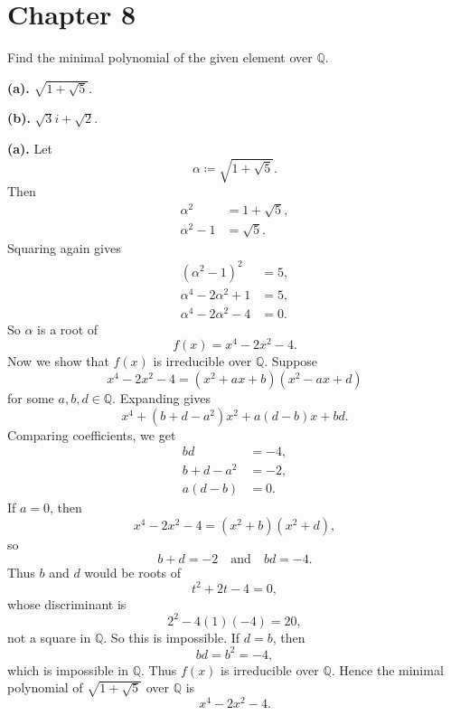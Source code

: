 
\section{Chapter 8}

\begin{problem}{
    Find the minimal polynomial of the given element over $\mathbb{Q}$.

    \textbf{(a).}
    $\sqrt{1+\sqrt{5}}$.

    \textbf{(b).}
    $\sqrt{3}i + \sqrt{2}$.
}
    \textbf{(a).}
    Let
    \[
        \alpha \coloneqq \sqrt{1+\sqrt{5}}.
    \]
    Then
    \begin{align*}
        \alpha^2 &= 1+\sqrt{5},\\
        \alpha^2 - 1 &= \sqrt{5}.
    \end{align*}
    Squaring again gives
    \begin{align*}
        (\alpha^2 - 1)^2 &= 5,\\
        \alpha^4 - 2\alpha^2 + 1 &= 5,\\
        \alpha^4 - 2\alpha^2 - 4 &= 0.
    \end{align*}
    So $\alpha$ is a root of
    \[
        f(x) = x^4 - 2x^2 - 4.
    \]
    Now we show that $f(x)$ is irreducible over $\mathbb{Q}$.
    Suppose
    \[
        x^4 - 2x^2 - 4 = (x^2 + ax + b)(x^2 - ax + d)
    \]
    for some $a,b,d\in\mathbb{Q}$.
    Expanding gives
    \[
        x^4 + (b+d-a^2)x^2 + a(d-b)x + bd.
    \]
    Comparing coefficients, we get
    \begin{align*}
        bd &= -4,\\
        b+d-a^2 &= -2,\\
        a(d-b) &= 0.
    \end{align*}
    If $a=0$, then
    \[
        x^4 - 2x^2 - 4 = (x^2+b)(x^2+d),
    \]
    so
    \[
        b+d = -2
        \quad\text{and}\quad
        bd = -4.
    \]
    Thus $b$ and $d$ would be roots of
    \[
        t^2 + 2t - 4 = 0,
    \]
    whose discriminant is
    \[
        2^2 - 4(1)(-4) = 20,
    \]
    not a square in $\mathbb{Q}$.
    So this is impossible.
    If $d=b$, then
    \[
        bd = b^2 = -4,
    \]
    which is impossible in $\mathbb{Q}$.
    Thus $f(x)$ is irreducible over $\mathbb{Q}$.
    Hence the minimal polynomial of $\sqrt{1+\sqrt{5}}$ over $\mathbb{Q}$ is
    \[
        x^4 - 2x^2 - 4.
    \]


\end{problem}
